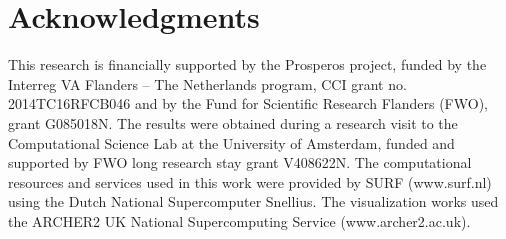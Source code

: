 \section*{Acknowledgments}

This research is financially supported by the Prosperos project, funded by the Interreg VA Flanders – The Netherlands program, CCI grant no. 2014TC16RFCB046 and by the Fund for Scientific Research Flanders (FWO), grant G085018N. The results were obtained during a research visit to the Computational Science Lab at the University of Amsterdam, funded and supported by FWO long research stay grant V408622N. The computational resources and services used in this work were provided by SURF (www.surf.nl) using the Dutch National Supercomputer Snellius. The visualization works used the ARCHER2 UK National Supercomputing Service (www.archer2.ac.uk).


\cleardoublepage
